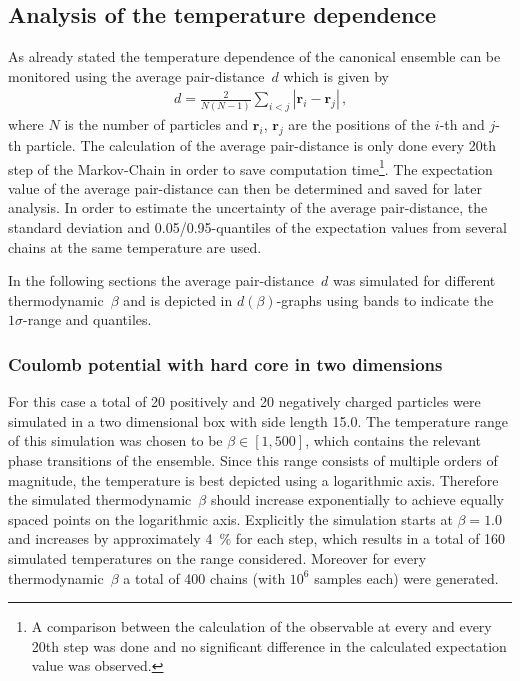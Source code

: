 \documentclass[11pt, a4paper]{article}
\numberwithin{equation}{section}
\begin{document}
\subsection{Analysis of the temperature dependence} \label{sec:Temp_Dep}
As already stated the temperature dependence of the canonical ensemble can be monitored using the average pair-distance~$d$ which is given by
\begin{align*}
d = \frac{2}{N(N - 1)} \sum_{i<j} |\mathbf{r}_i - \mathbf{r}_j | \, \text{,}
\end{align*}
where $N$ is the number of particles and $\mathbf{r}_i$, $\mathbf{r}_j$ are the positions of the $i$-th and $j$-th particle.
The calculation of the average pair-distance is only done every 20th step of the Markov-Chain in order to save computation time\footnote{A comparison between the calculation of the observable at every and every 20th step was done and no significant difference in the calculated expectation value was observed.}.
The expectation value of the average pair-distance can then be determined and saved for later analysis.
In order to estimate the uncertainty of the average pair-distance, the standard deviation and 0.05/0.95-quantiles of the expectation values from several chains at the same temperature are used.

In the following sections the average pair-distance~$d$ was simulated for different thermodynamic~$\beta$ and is depicted in $d(\beta)$-graphs using bands to indicate the $1\sigma$-range and quantiles.

\subsubsection{Coulomb potential with hard core in two dimensions} \label{sec:2d_coulomb_tempdep}
For this case a total of 20 positively and 20 negatively charged particles were simulated in a two dimensional box with side length 15.0.
The temperature range of this simulation was chosen to be $\beta \in [1, 500]$, which contains the relevant phase transitions of the ensemble.
Since this range consists of multiple orders of magnitude, the temperature is best depicted using a logarithmic axis.
Therefore the simulated thermodynamic~$\beta$ should increase exponentially to achieve equally spaced points on the logarithmic axis.
Explicitly the simulation starts at $\beta = 1.0$ and increases by approximately \SI{4}{\percent} for each step, which results in a total of 160 simulated temperatures on the range considered.
Moreover for every thermodynamic~$\beta$ a total of \num{400} chains (with $10^6$ samples each) were generated.
\end{document}
